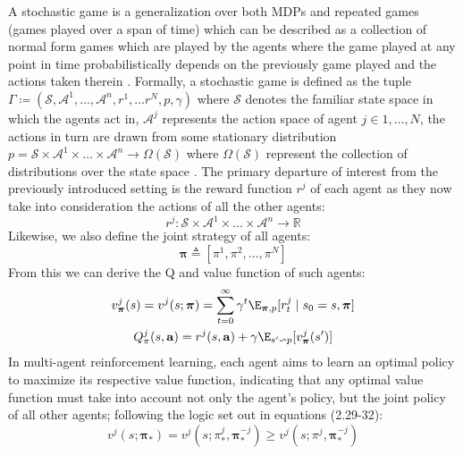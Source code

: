 A stochastic game is a generalization over both MDPs and repeated games (games played over a span of time)
which can be described as a collection of normal form games which are played by the agents where 
the game played at any point in time probabilistically depends on the previously game played
and the actions taken therein \cite{shoham2009multiagent}. 
Formally, a stochastic game is defined as the tuple $\Gamma \coloneqq (\mathcal{S}, \mathcal{A}^1, \hdots, \mathcal{A}^n, r^1, \hdots r^N, p, \gamma)$
where $\mathcal{S}$ denotes the familiar state space in which the agents act in,  $\mathcal{A}^j$ represents the action
space of agent $j \in {1, \hdots, N}$, the actions in turn are drawn from some stationary distribution $p = \mathcal{S} \times \mathcal{A}^1 \times \hdots \times \mathcal{A}^n \rightarrow \Omega(\mathcal{S})$
where $\Omega(\mathcal{S})$ represent the collection of distributions over the state space \cite{Yang2018}. 
The primary departure of interest from the previously introduced setting is the reward 
function $r^j$ of each agent as they now take into consideration the actions of all the other agents:
\begin{equation}
    r^j : \mathcal{S}\times \mathcal{A}^1\times \hdots \times \mathcal{A}^n \rightarrow \mathbb{R}
\end{equation}
Likewise, we also define the joint strategy of all agents:
\begin{equation}
    \boldsymbol \pi \triangleq [\pi^1, \pi^2, \hdots, \pi^N]
\end{equation}
From this we can derive the Q and value function of such agents:
\begin{equation}
    \begin{gathered}
        v_{\boldsymbol \pi}^j(s) = v^j(s;\boldsymbol \pi ) = \sum_{t=0}^{\infty} \gamma^t \E_{\boldsymbol \pi, p}[r^j_t \mid s_0 = s, \boldsymbol \pi] \\
        Q_\pi^j(s, \mathbf{a}) = r^j(s, \mathbf{a}) + \gamma \E_{s' \backsim p}[v^j_{\boldsymbol \pi}(s')]
    \end{gathered}
\end{equation}
In multi-agent reinforcement learning, each agent aims to learn an optimal policy to maximize
its respective value function, indicating that any optimal value function must
take into account not only the agent's policy, but the joint policy of all other agents;
following the logic set out in equations (2.29-32):
\begin{equation}
    v^j(s; \boldsymbol \pi_*) = v^j(s;\pi^j_*,\boldsymbol \pi^{-j}_*) \geq v^j(s;\pi^j,\boldsymbol \pi^{-j}_*)
\end{equation}
